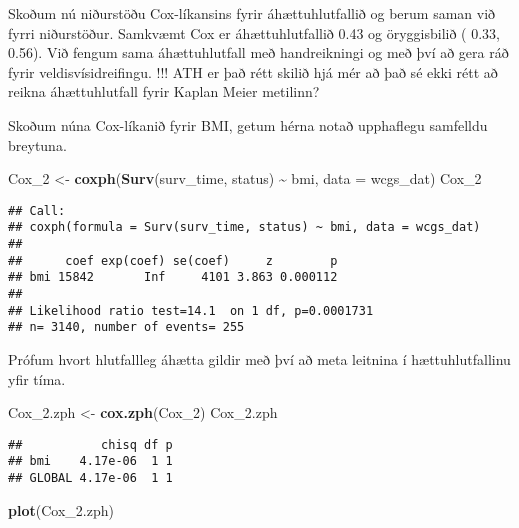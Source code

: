 \documentclass[
]{book}
\newenvironment{Shaded}{\begin{snugshade}}{\end{snugshade}}
\newcommand{\DataTypeTok}[1]{\textcolor[rgb]{0.13,0.29,0.53}{#1}}
\newcommand{\DecValTok}[1]{\textcolor[rgb]{0.00,0.00,0.81}{#1}}
\newcommand{\FloatTok}[1]{\textcolor[rgb]{0.00,0.00,0.81}{#1}}
\newcommand{\KeywordTok}[1]{\textcolor[rgb]{0.13,0.29,0.53}{\textbf{#1}}}
\newcommand{\NormalTok}[1]{#1}
\newcommand{\OperatorTok}[1]{\textcolor[rgb]{0.81,0.36,0.00}{\textbf{#1}}}
\newcommand{\StringTok}[1]{\textcolor[rgb]{0.31,0.60,0.02}{#1}}
\begin{document}
Skoðum nú niðurstöðu Cox-líkansins fyrir áhættuhlutfallið og berum saman við fyrri niðurstöður. Samkvæmt Cox er áhættuhlutfallið 0.43 og öryggisbilið ( 0.33, 0.56). Við fengum sama áhættuhlutfall með handreikningi og með því að gera ráð fyrir veldisvísidreifingu. !!! ATH er það rétt skilið hjá mér að það sé ekki rétt að reikna áhættuhlutfall fyrir Kaplan Meier metilinn?

Skoðum núna Cox-líkanið fyrir BMI, getum hérna notað upphaflegu samfelldu breytuna.

\begin{Shaded}
\begin{Highlighting}[]
\NormalTok{Cox\_}\DecValTok{2}\NormalTok{ <{-}}\StringTok{ }\KeywordTok{coxph}\NormalTok{(}\KeywordTok{Surv}\NormalTok{(surv\_time, status) }\OperatorTok{\textasciitilde{}}\StringTok{ }\NormalTok{bmi, }\DataTypeTok{data =}\NormalTok{ wcgs\_dat)}
\NormalTok{Cox\_}\DecValTok{2}
\end{Highlighting}
\end{Shaded}

\begin{verbatim}
## Call:
## coxph(formula = Surv(surv_time, status) ~ bmi, data = wcgs_dat)
## 
##      coef exp(coef) se(coef)     z        p
## bmi 15842       Inf     4101 3.863 0.000112
## 
## Likelihood ratio test=14.1  on 1 df, p=0.0001731
## n= 3140, number of events= 255
\end{verbatim}

Prófum hvort hlutfallleg áhætta gildir með því að meta leitnina í hættuhlutfallinu yfir tíma.

\begin{Shaded}
\begin{Highlighting}[]
\NormalTok{Cox\_}\FloatTok{2.}\NormalTok{zph <{-}}\StringTok{ }\KeywordTok{cox.zph}\NormalTok{(Cox\_}\DecValTok{2}\NormalTok{)}
\NormalTok{Cox\_}\FloatTok{2.}\NormalTok{zph}
\end{Highlighting}
\end{Shaded}

\begin{verbatim}
##           chisq df p
## bmi    4.17e-06  1 1
## GLOBAL 4.17e-06  1 1
\end{verbatim}

\begin{Shaded}
\begin{Highlighting}[]
\KeywordTok{plot}\NormalTok{(Cox\_}\FloatTok{2.}\NormalTok{zph)}
\end{Highlighting}
\end{Shaded}
\end{document}
